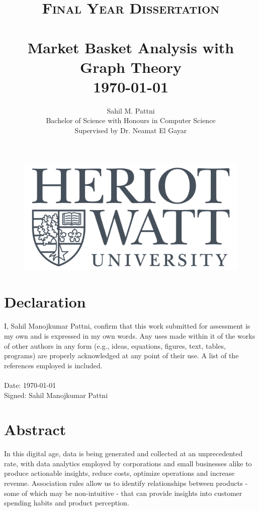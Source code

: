 \documentclass[paper=a4,fontsize=11pt]{report}	%
\title{	\normalsize \textsc{Final Year Dissertation} 	%
		 	\\[2.0cm]								%
			\HRule{0.5pt} \\						%
			\LARGE \textbf{{Market Basket Analysis with Graph Theory}}	%
			\HRule{2pt} \\ [0.5cm]		%
			\normalsize \today			%
		}
\author{
		Sahil M. Pattni\\	
		Bachelor of Science with Honours in Computer Science\\
        Supervised by Dr. Neamat El Gayar \\
}
\makeatletter
\def\printtitle{%
    {\centering \@title\par}}
\def\printauthor{%
    {\centering \large \@author}}
\newcommand{\me}{Sahil Manojkumar Pattni}        %
\makeatother
\begin{document}
\thispagestyle{empty}		%

\begin{figure}[H]
\centering
\includegraphics[scale=0.22]{hw_logo.png}
\end{figure}

\printtitle					%
  	\vfill


\printauthor				%

\pagebreak
\thispagestyle{empty}		%
\hspace{0pt}
\vfill
\section*{Declaration}
I, \me, confirm that this work submitted for assessment is my own and is expressed in my own words. Any uses made within it of the works of other authors in any form (e.g., ideas, equations, figures, text, tables, programs) are properly acknowledged at any point of their use. A list of the references employed is included.
\\\\Date: \today
\\Signed: \me

\vfill
\hspace{0pt}
\pagebreak

\newpage
\thispagestyle{empty}
\section*{Abstract}
In this digital age, data is being generated and collected at an unprecedented rate, with data analytics employed by corporations and small businesses alike to produce actionable insights, reduce costs, optimize operations and increase revenue. Association rules allow us to identify relationships between products - some of which may be non-intuitive - that can provide insights into customer spending habits and product perception.
\end{document}

